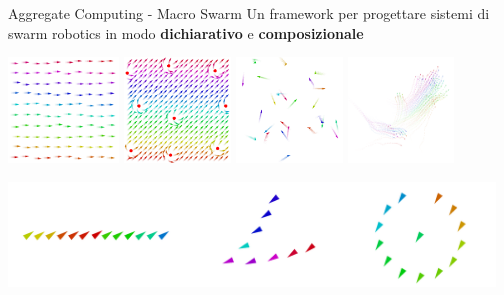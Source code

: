 \documentclass[presentation, 10pt,aspectratio=169]{beamer}\mode<presentation>{\usetheme{AMSBolognaFC}}
\begin{document}
\begin{frame}{Aggregate Computing - Macro Swarm}
	Un framework per progettare sistemi di swarm robotics in modo \textbf{dichiarativo} e \textbf{composizionale}
	\begin{center}
		\includegraphics[height=2.8cm]{img/constant-movement.png}
		\includegraphics[height=2.8cm]{img/obstracle.png}		
		\includegraphics[height=2.8cm]{img/explore-2.png}
		\includegraphics[height=2.8cm]{img/flock.png}
	  \end{center}
	  \begin{center}
		\includegraphics[height=2.8cm]{img/shapes.png}
	  \end{center}
\end{frame}
\end{document}
